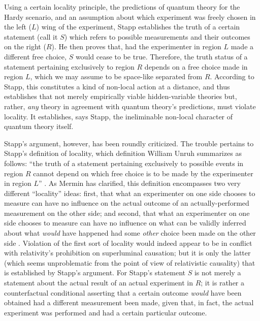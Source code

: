 \documentclass[aps,prc,onecolumn,12pt]{revtex4-2}
\begin{document}
Using a certain locality principle, the predictions of quantum
theory for the Hardy
scenario, and an assumption about which experiment was freely chosen
in the left ($L$) wing of the experiment, Stapp establishes the truth
of a certain statement (call it $S$) which refers to possible
measurements and their outcomes on the right ($R$).
He then proves that, had the
experimenter in region $L$ made a different free choice, $S$ would
cease to be true.  Therefore, the truth status of a statement pertaining
exclusively to region $R$ depends on a free choice made in region $L$,
which we may assume to be space-like separated from $R$.  According to
Stapp, this constitutes a kind of non-local action at a distance, and
thus establishes that not merely empirically viable hidden-variable
theories but, rather, \emph{any} theory in agreement with quantum
theory's
predictions, must violate locality.  It establishes, says Stapp, the
ineliminable non-local character of quantum theory itself.

Stapp's argument, however, has been roundly criticized.  The trouble
pertains to Stapp's definition of locality, which definition William
Unruh summarizes as follows:  ``the
truth of a statement pertaining exclusively to possible events in
region $R$ cannot depend on which free choice is to be made by the
experimenter in region $L$''  \cite{unruh}.
As Mermin has clarified, this definition encompasses
two very different ``locality'' ideas:  first, that what
an experimenter on one side chooses to measure can have no influence
on the actual outcome of an actually-performed measurement on the
other side; and second, that what an experimenter on one side chooses to
measure can have no influence on what can be validly inferred about
what \emph{would} have happened had some \emph{other} choice been made
on the other side \cite{mermin}.  Violation of the first sort of
locality would indeed appear to be in
conflict with relativity's prohibition on superluminal causation; but
it is only the latter (which seems unproblematic from the point of
view of relativistic causality) that is established by Stapp's
argument.   For Stapp's statement $S$ is not merely a statement about the
actual result of an actual experiment in $R$; it is rather a
counterfactual conditional asserting that a certain outcome
\emph{would} have been obtained had a different measurement been made,
given that, in fact, the actual experiment was performed and had a
certain particular outcome.
\end{document}

